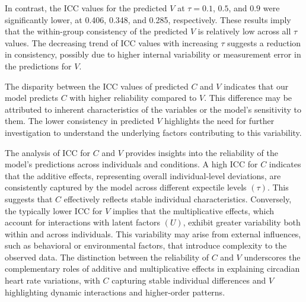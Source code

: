 \documentclass{article}
\begin{document}
In contrast, the ICC values for the predicted $V$ at $\tau = 0.1$, $0.5$, and $0.9$ were significantly lower, at 0.406, 0.348, and 0.285, respectively. These results imply that the within-group consistency of the predicted $V$ is relatively low across all $\tau$ values. The decreasing trend of ICC values with increasing $\tau$ suggests a reduction in consistency, possibly due to higher internal variability or measurement error in the predictions for $V$.

The disparity between the ICC values of predicted $C$ and $V$ indicates that our model predicts $C$ with higher reliability compared to $V$. This difference may be attributed to inherent characteristics of the variables or the model's sensitivity to them. The lower consistency in predicted $V$ highlights the need for further investigation to understand the underlying factors contributing to this variability.

The analysis of ICC for $C$ and $V$ provides insights into the reliability of the model's predictions across individuals and conditions. A high ICC for $C$ indicates that the additive effects, representing overall individual-level deviations, are consistently captured by the model across different expectile levels $(\tau)$. This suggests that $C$ effectively reflects stable individual characteristics. Conversely, the typically lower ICC for $V$ implies that the multiplicative effects, which account for interactions with latent factors $(U)$, exhibit greater variability both within and across individuals. This variability may arise from external influences, such as behavioral or environmental factors, that introduce complexity to the observed data. The distinction between the reliability of $C$ and $V$ underscores the complementary roles of additive and multiplicative effects in explaining circadian heart rate variations, with $C$ capturing stable individual differences and $V$ highlighting dynamic interactions and higher-order patterns.
\end{document}
